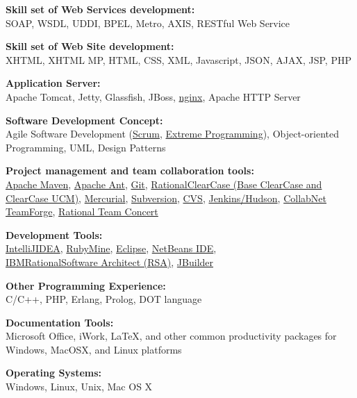 \blankline

{\textbf{Skill set of Web Services development:}}\\
SOAP, WSDL, UDDI, BPEL, Metro, AXIS, RESTful Web Service


\blankline

{\textbf{Skill set of Web Site development:}}\\
XHTML, XHTML MP, HTML, CSS, XML, Javascript, JSON, AJAX, JSP, PHP 

\blankline

{\textbf{Application Server:}}\\
Apache Tomcat, Jetty, Glassfish, JBoss, 
\href{http://nginx.net/}{nginx}, Apache HTTP Server

\blankline

{\textbf{Software Development Concept:}}\\
Agile Software Development 
(\href{http://en.wikipedia.org/wiki/Scrum_\%28development\%29}{Scrum}, 
\href{http://www.extremeprogramming.org/}{Extreme Programming}), Object-oriented Programming, UML, Design \nolinebreak Patterns

\blankline

{\textbf{Project management and team collaboration tools:}}\\
\href{http://maven.apache.org/}{Apache Maven},
\href{http://ant.apache.org/}{Apache Ant}, 
\href{http://git-scm.com/}{Git}, \href{http://www-01.ibm.com/software/awdtools/clearcase/index.html}{Rational\textregistered\space ClearCase (Base ClearCase and ClearCase UCM)},
\href{http://mercurial.selenic.com/}{Mercurial},
\href{http://subversion.tigris.org/}{Subversion}, 
\href{http://www.nongnu.org/cvs/}{CVS},
\href{http://jenkins-ci.org/}{Jenkins/Hudson},
\href{http://www.open.collab.net/products/ctf/}{CollabNet TeamForge},
\href{https://jazz.net/projects/rational-team-concert/}{Rational Team Concert}

\blankline

{\textbf{Development Tools:}}\\
\href{http://www.jetbrains.com/idea/}{IntelliJ\textregistered\space IDEA},
\href{http://www.jetbrains.com/ruby}{RubyMine\texttrademark},
\href{http://www.eclipse.org/}{Eclipse},
\href{http://netbeans.org/}{NetBeans IDE}, \\
\href{http://www.ibm.com/developerworks/rational/products/rsa/}{IBM\textregistered\space Rational\textregistered\space Software Architect (RSA)},
\href{http://www.embarcadero.com/products/jbuilder}{JBuilder}

\blankline

{\textbf{Other Programming Experience:}}\\
C/C++, PHP, Erlang, Prolog, DOT language

\blankline

{\textbf{Documentation Tools:}}\\ 
Microsoft Office, iWork, \LaTeX{}, 
and other common productivity packages for Windows, Mac\nolinebreak\space OS\nolinebreak\space X, and
Linux platforms

\blankline

{\textbf{Operating Systems:}}\\
Windows, Linux, Unix, Mac OS X\\
